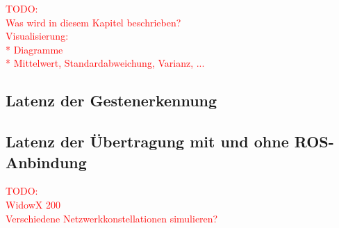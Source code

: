 














\textcolor{red}{TODO:\\
Was wird in diesem Kapitel beschrieben?\\
Visualisierung:\\
* Diagramme\\
* Mittelwert, Standardabweichung, Varianz, ...
}

\subsection{Latenz der Gestenerkennung}


\subsection{Latenz der Übertragung mit und ohne ROS-Anbindung}
\textcolor{red}{TODO:\\
WidowX 200\\
Verschiedene Netzwerkkonstellationen simulieren? %
}

